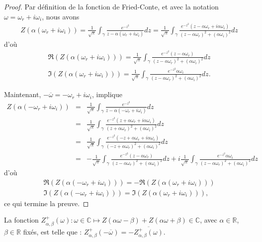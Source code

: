  \begin{proof}
Par définition de la fonction de Fried-Conte, et avec la notation $\omega=\omega_r+i\omega_i$, nous avons
\begin{eqnarray*}
Z(\alpha(\omega_r+i\omega_i))=\frac{1}{\sqrt{\pi}}\int_\gamma\frac{e^{-z^2}}{z-\alpha(\omega_r+i\omega_i)}dz=\frac{1}{\sqrt{\pi}}\int_\gamma\frac{e^{-z^2}(z-\alpha\omega_r+i\alpha\omega_i)}{(z-\alpha\omega_r)^2+(\alpha\omega_i)^2}dz
\end{eqnarray*}
d'où
\begin{eqnarray*}
\Re\left(Z(\alpha(\omega_r+i\omega_i))\right)=\frac{1}{\sqrt{\pi}}\int_\gamma\frac{e^{-z^2}(z-\alpha\omega_r)}{(z-\alpha\omega_r)^2+(\alpha\omega_i)^2}dz\\
\Im\left(Z(\alpha(\omega_r+i\omega_i))\right)=\frac{1}{\sqrt{\pi}}\int_\gamma\frac{e^{-z^2}\alpha\omega_i}{(z-\alpha\omega_r)^2+(\alpha\omega_i)^2}dz.
\end{eqnarray*}

Maintenant, $-\overline{\omega}=-\omega_r+i\omega_i$, implique
\begin{eqnarray*}
Z(\alpha(-\omega_r+i\omega_i))&=&\frac{1}{\sqrt{\pi}}\int_\gamma\frac{e^{-z^2}}{z-\alpha(-\omega_r+i\omega_i)}dz\\
&=&\frac{1}{\sqrt{\pi}}\int_\gamma\frac{e^{-z^2}(z+\alpha\omega_r+i\alpha\omega_i)}{(z+\alpha\omega_r)^2+(\alpha\omega_i)^2}dz\\
&=&\frac{1}{\sqrt{\pi}}\int_\gamma\frac{e^{-z^2}(-z+\alpha\omega_r+i\alpha\omega_i)}{(-z+\alpha\omega_r)^2+(\alpha\omega_i)^2}dz\\
&=&-\frac{1}{\sqrt{\pi}}\int_\gamma\frac{e^{-z^2}(z-\alpha\omega_r)}{(z-\alpha\omega_r)^2+(\alpha\omega_i)^2}dz+i\frac{1}{\sqrt{\pi}}\int_\gamma\frac{e^{-z^2}\alpha\omega_i}{(z-\alpha\omega_r)^2+(\alpha\omega_i)^2}dz
\end{eqnarray*}
d'où
\begin{eqnarray*}
\Re\left(Z(\alpha(-\omega_r+i\omega_i))\right)=-\Re\left(Z(\alpha(\omega_r+i\omega_i))\right)\\
\Im\left(Z(\alpha(-\omega_r+i\omega_i))\right)=\Im\left(Z(\alpha(\omega_r+i\omega_i))\right),
\end{eqnarray*}
ce qui termine la preuve.
\end{proof}


\begin{lemma}
  La fonction $Z_{\alpha,\beta}^+(\omega):\omega\in\mathbb{C}\mapsto Z\left(\alpha\omega-\beta\right)+Z\left(\alpha\omega+\beta\right)\in\mathbb{C}$, avec $\alpha\in\mathbb{R}$, $\beta\in\mathbb{R}$ fixés, est telle que : $Z_{\alpha,\beta}^+\left(-\overline{\omega}\right)=-\overline{Z_{\alpha,\beta}^+(\omega)}$.
  \end{lemma}
  
